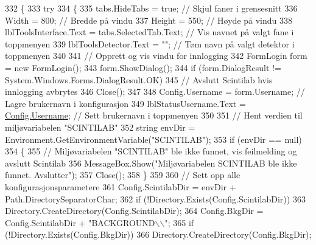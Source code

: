 \begin{DoxyCode}
332         \{
333             \textcolor{keywordflow}{try}
334             \{
335                 tabs.HideTabs = \textcolor{keyword}{true}; \textcolor{comment}{// Skjul faner i grensesnitt}
336                 Width = 800; \textcolor{comment}{// Bredde på vindu}
337                 Height = 550; \textcolor{comment}{// Høyde på vindu}
338                 lblToolsInterface.Text = tabs.SelectedTab.Text; \textcolor{comment}{// Vis navnet på valgt fane i toppmenyen}
339                 lblToolsDetector.Text = \textcolor{stringliteral}{""}; \textcolor{comment}{// Tøm navn på valgt detektor i toppmenyen}
340 
341                 \textcolor{comment}{// Opprett og vis vindu for innlogging}
342                 FormLogin form = \textcolor{keyword}{new} FormLogin();
343                 form.ShowDialog();
344                 \textcolor{keywordflow}{if} (form.DialogResult != System.Windows.Forms.DialogResult.OK)
345                     \textcolor{comment}{// Avslutt Scintilab hvis innlogging avbrytes}
346                     Close();
347 
348                 Config.Username = form.Username; \textcolor{comment}{// Lagre brukernavn i konfigurasjon}
349                 lblStatusUsername.Text = \hyperlink{class_scintilab_1_1_config_a46bec74f1139be16639b257d38580f22}{Config.Username}; \textcolor{comment}{// Sett brukernavn i toppmenyen}
350 
351                 \textcolor{comment}{// Hent verdien til miljøvariabelen "SCINTILAB"}
352                 \textcolor{keywordtype}{string} envDir = Environment.GetEnvironmentVariable(\textcolor{stringliteral}{"SCINTILAB"});
353                 \textcolor{keywordflow}{if} (envDir == null)
354                 \{
355                     \textcolor{comment}{// Miljøvariabelen "SCINTILAB" ble ikke funnet, vis feilmelding og avslutt Scintilab}
356                     MessageBox.Show(\textcolor{stringliteral}{"Miljøvariabelen SCINTILAB ble ikke funnet. Avslutter"});
357                     Close();
358                 \}
359 
360                 \textcolor{comment}{// Sett opp alle konfigurasjonsparametere}
361                 Config.ScintilabDir = envDir + Path.DirectorySeparatorChar;
362                 \textcolor{keywordflow}{if} (!Directory.Exists(Config.ScintilabDir))
363                     Directory.CreateDirectory(Config.ScintilabDir);
364                 Config.BkgDir = Config.ScintilabDir + \textcolor{stringliteral}{"BACKGROUND\(\backslash\)\(\backslash\)"};
365                 \textcolor{keywordflow}{if} (!Directory.Exists(Config.BkgDir))
366                     Directory.CreateDirectory(Config.BkgDir);

\end{DoxyCode}
